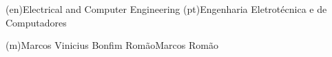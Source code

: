 %
%
%
%
\ntdegreename(en){Electrical and Computer Engineering}          %
\ntdegreename(pt){Engenharia Eletrotécnica e de Computadores} %



%
%
%
%



%
%
\ntauthorname(m){Marcos Vinicius Bonfim Romão}{Marcos Romão}




